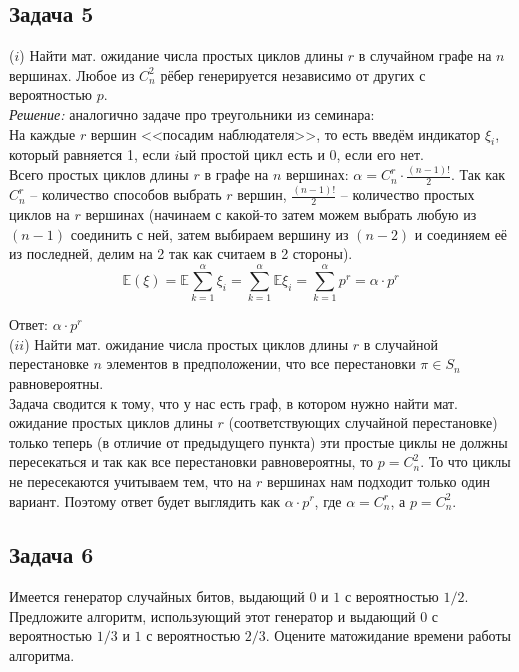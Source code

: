 \documentclass[a4paper,12pt]{article} %
\begin{document}
\subsection*{Задача 5}
($i$) Найти мат. ожидание числа простых циклов длины $r$ в случайном графе на $n$ вершинах. Любое из $C_n^2$ рёбер генерируется независимо от других с вероятностью $p$.\\

\textit{Решение:} аналогично задаче про треугольники из семинара:\\
На каждые $ r $ вершин <<посадим наблюдателя>>, то есть введём индикатор $ \xi_i $, который равняется 1, если $ i $ый простой цикл есть и 0, если его нет.\\
Всего простых циклов длины $ r $ в графе на $ n $ вершинах: $ \alpha =  C_{n}^{r} \cdot \frac{(n - 1)!}{2} $. Так как $ C_{n}^{r} $ -- количество способов выбрать $ r $ вершин, $ \frac{(n - 1)!}{2} $ -- количество простых циклов на $ r $ вершинах (начинаем с какой-то затем можем выбрать любую из $ (n-1) $ соединить с ней, затем выбираем вершину из $ (n-2) $ и соединяем её из последней, делим на 2 так как считаем в 2 стороны).\\
$$\mathbb{E}(\xi) = \mathbb{E}\sum\limits_{k=1}^{\alpha} \xi_i = \sum\limits_{k=1}^{\alpha}\mathbb{E} \xi_i = \sum\limits_{k=1}^{\alpha} p^r = \alpha \cdot p^r
$$

Ответ: $ \alpha \cdot p^r $\\

($ii$) Найти мат. ожидание числа простых циклов длины $r$ в случайной перестановке $n$ элементов в предположении, что все перестановки $\pi \in S_n$ равновероятны. \smallskip \\

Задача сводится к тому, что у нас есть граф, в котором нужно найти мат. ожидание простых циклов длины $ r $ (соответствующих случайной перестановке) только теперь (в отличие от предыдущего пункта) эти простые циклы не должны пересекаться и так как все перестановки равновероятны, то $ p = C_{n}^{2} $. То что циклы не пересекаются учитываем тем, что на $ r $ вершинах нам подходит только один вариант. Поэтому ответ будет выглядить как $ \alpha \cdot p^r $, где $ \alpha = C_{n}^{r} $, а $ p = C_{n}^{2} $.

\subsection*{Задача 6}
Имеется генератор случайных битов, выдающий $0$ и $1$ с вероятностью $1/2$. Предложите алгоритм, использующий этот генератор и выдающий $0$ с вероятностью $1/3$ и $1$ с вероятностью $2/3$. Оцените матожидание времени работы алгоритма. \\
\end{document}
